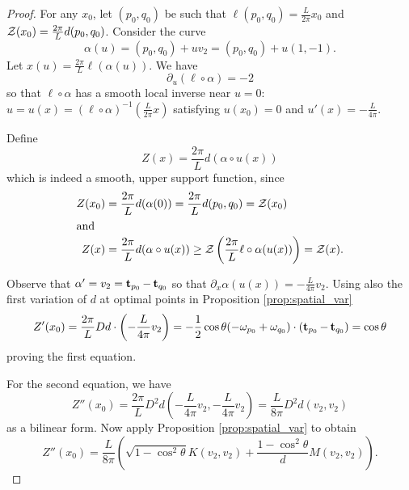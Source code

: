 \documentclass[11pt]{amsart}
\begin{document}
\begin{proof}
For any $x_0$, let $(p_0,q_0)$ be such that $\ell(p_0,q_0) = \tfrac{L}{2\pi} x_0$ and $\operatorname{\mathcal{Z}}(x_0) = \tfrac{2\pi}{L} d(p_0,q_0)$. Consider the curve
\[
\alpha(u) = (p_0, q_0) + uv_2 = (p_0, q_0) + u(1,-1).
\]
Let \(x(u) = \tfrac{2\pi}{L} \ell(\alpha(u))\). We have
\[
\partial_u (\ell \circ \alpha) = -2
\]
so that $\ell\circ\alpha$ has a smooth local inverse near $u=0$: \(u = u(x) = (\ell \circ \alpha)^{-1}(\tfrac{L}{2\pi} x)\) satisfying \(u(x_0) = 0\) and \(u'(x) = -\tfrac{L}{4\pi}\).

Define
\[
Z(x) = \frac{2\pi}{L} d(\alpha \circ u (x))
\]
which is indeed a smooth, upper support function, since
\begin{align*}
Z(x_0) &= \frac{2\pi}{L} d(\alpha(0)) = \frac{2\pi}{L} d(p_0, q_0) = \operatorname{\mathcal{Z}}(x_0) \\
\intertext{and}
Z(x) &= \frac{2\pi}{L} d(\alpha \circ u(x)) \geq \operatorname{\mathcal{Z}} \left(\frac{2\pi}{L}\ell\circ\alpha(u(x))\right) = \operatorname{\mathcal{Z}}(x).
\end{align*}

Observe that $\alpha' = v_2 = \operatorname{\mathbf{t}}_{p_0} - \operatorname{\mathbf{t}}_{q_0}$ so that \(\partial_x \alpha(u(x)) = -\tfrac{L}{4\pi} v_2\). Using also the first variation of $d$ at optimal points in Proposition \ref{prop:spatial_var}
\[
Z'(x_0) = \frac{2\pi}{L} Dd \cdot \left(-\frac{L}{4\pi}v_2\right) = -\frac{1}{2} \cos\theta (-\omega_{p_0} + \omega_{q_0}) \cdot (\operatorname{\mathbf{t}}_{p_0} - \operatorname{\mathbf{t}}_{q_0}) = \cos\theta
\]
proving the first equation.

For the second equation, we have
\[
Z''(x_0) = \frac{2\pi}{L} D^2 d \left(-\frac{L}{4\pi} v_2, -\frac{L}{4\pi} v_2\right) = \frac{L}{8\pi} D^2 d (v_2, v_2)
\]
as a bilinear form. Now apply Proposition \ref{prop:spatial_var} to obtain
\begin{equation}
\label{eq:barrier_secondvar}
Z''(x_0) = \frac{L}{8\pi} \left(\sqrt{1-\cos^2\theta} K (v_2, v_2) + \frac{1-\cos^2\theta}{d} M (v_2, v_2)\right).
\end{equation}


\end{proof}
\end{document}
